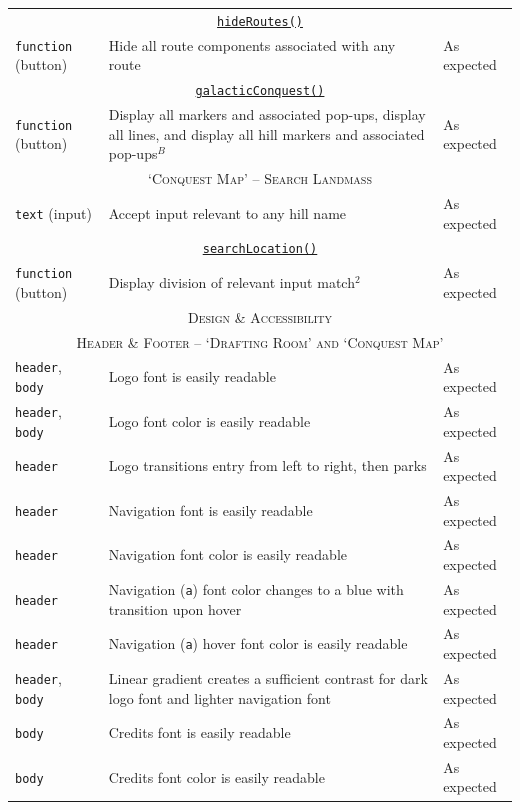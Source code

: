\documentclass[11pt, english]{article}
\begin{document}
\begin{center}
\begin{longtable}{p{3cm}p{8cm}p{2cm}}
		\multicolumn{3}{c}{\underline{\texttt{hideRoutes()}}}\\
		\texttt{function} (button) & Hide all route components associated with any route & As expected\\
		\multicolumn{3}{c}{\underline{\texttt{galacticConquest()}}}\\
		\texttt{function} (button) & Display all markers and associated pop-ups, display all lines, and display all hill markers and associated pop-ups$^{B}$ & As expected\\
		\hline
		\multicolumn{3}{c}{\textsc{`Conquest Map' -- Search Landmass}}\\
		\hline
		\texttt{text} (input) & Accept input relevant to any hill name & As expected\\
		\multicolumn{3}{c}{\underline{\texttt{searchLocation()}}}\\
		\texttt{function} (button) & Display division of relevant input match$^{2}$ & As expected\\
		\hline
		\hline
		\multicolumn{3}{c}{\textsc{Design \& Accessibility}}\\
		\hline
		\hline
		\multicolumn{3}{c}{\textsc{Header \& Footer -- `Drafting Room' and `Conquest Map'}}\\
		\hline
		\texttt{header}, \texttt{body} & Logo font is easily readable & As expected\\
		\texttt{header}, \texttt{body} & Logo font color is easily readable & As expected\\
		\texttt{header} & Logo transitions entry from left to right, then parks & As expected\\
		\texttt{header} & Navigation font is easily readable & As expected\\
		\texttt{header} & Navigation font color is easily readable & As expected\\
		\texttt{header} & Navigation (\texttt{a}) font color changes to a blue with transition upon hover & As expected\\
		\texttt{header} & Navigation (\texttt{a}) hover font color is easily readable & As expected\\
		\texttt{header}, \texttt{body} & Linear gradient creates a sufficient contrast for dark logo font and lighter navigation font & As expected\\
		\texttt{body} & Credits font is easily readable & As expected\\
		\texttt{body} & Credits font color is easily readable & As expected\\
		\hline

\end{longtable}
\end{center}
\end{document}
